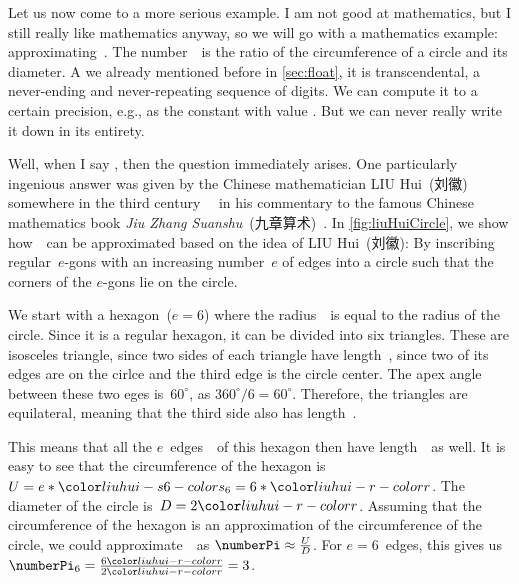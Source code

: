 %
\def\liuhuix{\ensuremath{{\color{liuhui-x-color}x}}}%
%
\def\liuhuistf{\ensuremath{{\color{liuhui-s24-color}s_{24}}}}%
%
Let us now come to a more serious example.
I am not good at mathematics, but I still really like mathematics anyway, so we will go with a mathematics example: approximating~\numberPi.
The number~\numberPi\ is the ratio of the circumference of a circle and its diameter.
A we already mentioned before in \cref{sec:float}, it is transcendental, a never-ending and never-repeating sequence of digits.
We can compute it to a certain precision, e.g., as the  constant  with value .
But we can never really write it down in its entirety.

Well, when I say , then the question  immediately arises.
One particularly ingenious answer was given by the Chinese mathematician LIU Hui~(刘徽) somewhere in the third century~~\cite{OR2003LH,Y2024COACMMLHFHTIOMACE} in his commentary to the famous Chinese mathematics book \emph{Jiu Zhang Suanshu}~(九章算术)~\cite{OR2003LH,SCL1999TNCOTMACAC,S1998LHATFGAOCM,D2010AALHOCAS,C2002LFLHADWTDM}.
In \cref{fig:liuHuiCircle}, we show how~\numberPi\ can be approximated based on the idea of LIU Hui~(刘徽):
By inscribing regular~$e$\nobreakdashes-gons with an increasing number~$e$ of edges into a circle such that the corners of the $e$\nobreakdashes-gons lie on the circle.

We start with a hexagon~($e=6$) where the radius~\liuhuir\ is equal to the radius of the circle.
Since it is a regular hexagon, it can be divided into six triangles.
These are isosceles triangle, since two sides of each triangle have length~\liuhuir, since two of its edges are on the cirlce and the third edge is the circle center.
The apex angle between these two eges is~$60^{\circ}$, as $360^{\circ}/6=60^{\circ}$.
Therefore, the triangles are equilateral, meaning that the third side also has length~\liuhuir.

This means that all the $e$~edges~\liuhuiss\ of this hexagon then have length~\liuhuir\ as well.
It is easy to see that the circumference of the hexagon is~$U=e*\liuhuiss=6*\liuhuir$.
The diameter of the circle is~$D=2\liuhuir$.
Assuming that the circumference of the hexagon is an approximation of the circumference of the circle, we could approximate~\numberPi\ as $\numberPi\approx\frac{U}{D}$.
For $e=6$~edges, this gives us $\numberPi_6=\frac{6\liuhuir}{2\liuhuir}=3$.

